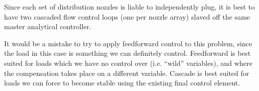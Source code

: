 Since each set of distribution nozzles is liable to independently plug, it is best to have two cascaded flow control loops (one per nozzle array) slaved off the same master analytical controller.

\vskip 10pt

It would be a mistake to try to apply feedforward control to this problem, since the load in this case is something we can definitely control.  Feedforward is best suited for loads which we have no control over (i.e. ``wild'' variables), and where the compensation takes place on a different variable.  Cascade is best suited for loads we can force to become stable using the existing final control element.




